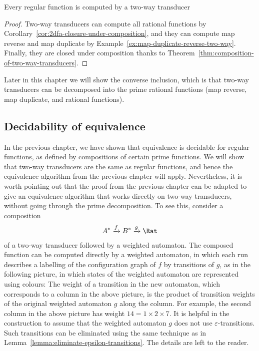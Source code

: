  

\begin{corollary}\label{cor:2dfa-computes-all-regular-functions}
    Every regular function  is computed by a two-way transducer
\end{corollary}
\begin{proof}
    Two-way transducers can compute all rational functions by Corollary~\ref{cor:2dfa-closure-under-composition}, and they can compute  map reverse and map duplicate by Example~\ref{ex:map-duplicate-reverse-two-way}. Finally, they are closed under composition thanks to Theorem~\ref{thm:composition-of-two-way-transducers}.
\end{proof}



Later in this chapter we will show the converse inclusion, which is that two-way transducers can be decomposed into the prime rational functions (map reverse, map duplicate, and rational functions).

\subsection{Decidability of equivalence}
\label{sec:decidability-equivalence-2dfa}

In the previous chapter, we have shown that equivalence is decidable for regular functions, as defined by compositions of certain prime functions. We will show that two-way transducers are the same as regular functions, and hence the equivalence algorithm from the previous chapter will apply. Nevertheless, it is worth pointing out that the proof from the previous chapter can be adapted to give an equivalence algorithm that works directly on two-way transducers, without going through the prime decomposition. To see this, consider a composition 
\begin{align*}
A^* \xrightarrow f B^* \xrightarrow g \Rat
\end{align*}
of a two-way transducer followed by a weighted automaton. The composed function can be computed directly by a weighted automaton, in which each run describes a labelling of the configuration graph of $f$ by transitions of $g$, as in the following picture, in which states of the weighted automaton are represented using colours:
The weight of a transition in the new automaton, which corresponds to a column in the above picture, is the product of transition weights of the original weighted automaton $g$ along the column. For example, the second column in the above picture has weight $14 = 1 \times 2 \times 7$. It is helpful in the construction to assume that the weighted automaton $g$ does not use $\varepsilon$-transitions. Such transitions can be eliminated using the same technique as in Lemma~\ref{lemma:eliminate-epsilon-transitions}. The details are left to the reader. 


